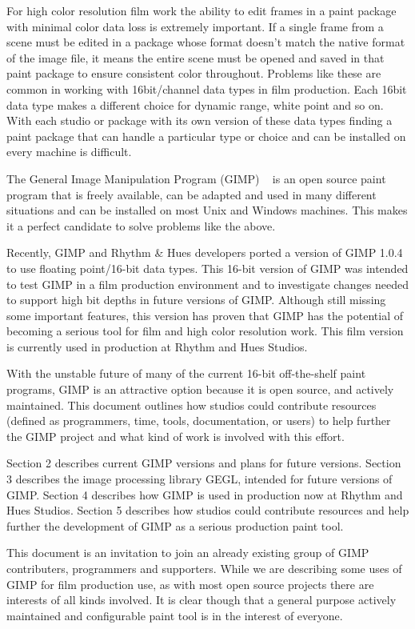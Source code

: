 
For high color resolution film work the ability to edit frames in a paint
package with minimal color data loss is extremely important. If a single frame
from a scene must be edited in a package whose format doesn't match the native
format of the image file, it means the entire scene must be opened and saved in
that paint package to ensure consistent color throughout.  Problems like these
are common in working with 16bit/channel data types in film production. Each
16bit data type makes a different choice for dynamic range, white point and so
on. With each studio or package with its own version of these data types
finding a paint package that can handle a particular type or choice and can be
installed on every machine is difficult.

The General Image Manipulation Program (GIMP) ~\cite{http://www.gimp.org} is an
open source paint program that is freely available, can be adapted and used in
many different situations and can be installed on most Unix and Windows
machines. This makes it a perfect candidate to solve problems like the above.

Recently, GIMP and Rhythm \& Hues developers ported a version of GIMP 1.0.4 to
use floating point/16-bit data types. This 16-bit version of GIMP was intended
to test GIMP in a film production environment and to investigate changes
needed to support high bit depths in future versions of GIMP. Although still
missing some important features, this version has proven that GIMP has the
potential of becoming a serious tool for film and high color resolution work.
This film version is currently used in production at Rhythm and Hues Studios.

With the unstable future of many of the current 16-bit off-the-shelf paint
programs, GIMP is an attractive option because it is open source, and actively
maintained. This document outlines how studios could contribute resources
(defined as programmers, time, tools, documentation, or users) to help further
the GIMP project and what kind of work is involved with this effort.

Section 2 describes current GIMP versions and plans for future versions.
Section 3 describes the image processing library GEGL, intended for future
versions of GIMP. Section 4 describes how GIMP is used in production now at
Rhythm and Hues Studios. Section 5 describes how studios could contribute
resources and help further the development of GIMP as a serious production
paint tool.

This document is an invitation to join an already existing group of GIMP
contributers, programmers and supporters. While we are describing some uses of
GIMP for film production use, as with most open source projects there are
interests of all kinds involved. It is clear though that a general purpose
actively maintained and configurable paint tool is in the interest of everyone.
